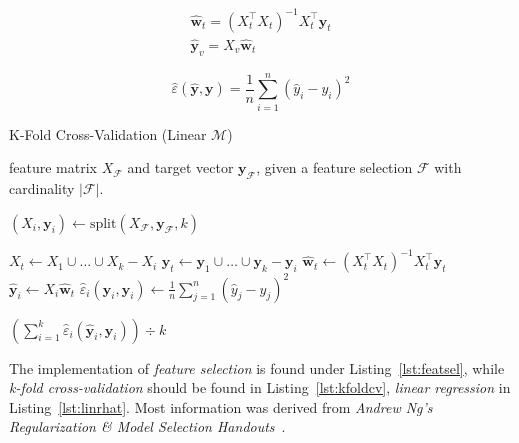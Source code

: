 \documentclass[a4paper, twocolumn]{article}
\begin{document}
    \begin{gather} \label{eq:linrhat}
        \mathbf{\hat{w}}^{}_t = (X_t^\intercal X^{}_t)^{-1} X_t^\intercal \mathbf{y}^{}_t \\
        \mathbf{\hat{y}}^{}_v = X^{}_v \mathbf{\hat{w}}^{}_t
    \end{gather}

    \begin{equation} \label{eq:mse}
        \hat{\varepsilon}(\mathbf{\hat{y}}, \mathbf{y}) = \frac{1}{n}\sum_{i=1}^{n}(\hat{y}_i - y_i)^2
    \end{equation}

    \begin{algorithm}
        \caption{K-Fold Cross-Validation (Linear $\mathcal{M}$)}
    \label{alg:kfoldcv}
    \begin{algorithmic}[1]
        \REQUIRE feature matrix $X_\mathcal{F}$ and target vector $\mathbf{y_\mathcal{F}}$,
                 given a feature selection $\mathcal{F}$ with cardinality $|\mathcal{F}|$.

        \STATE $(X_i, \mathbf{y}_i) \leftarrow \mathrm{split}(X_\mathcal{F}, \mathbf{y}_\mathcal{F}, k)$ 

            \STATE $X_t \leftarrow X_1 \cup \dots \cup X_k - X_i$ 
            \STATE $\mathbf{y}_t \leftarrow \mathbf{y}_1 \cup \dots \cup \mathbf{y}_k - \mathbf{y}_i$ 
            \STATE $\mathbf{\hat{w}}_t \leftarrow (X_t^\intercal X^{}_t)^{-1} X_t^\intercal \mathbf{y}^{}_t$ 
            \STATE $\mathbf{\hat{y}}^{}_i \leftarrow X^{}_i \mathbf{\hat{w}}^{}_t$ 
            \STATE $\hat{\varepsilon}_i(\mathbf{\hat{y}}_i, \mathbf{y}_i) \leftarrow \frac{1}{n}\sum_{j=1}^{n}(\hat{y}_j - y_j)^2$
        \ENDFOR

        \RETURN $(\sum_{i=1}^k{\hat{\varepsilon}_i(\mathbf{\hat{y}}_i, \mathbf{y}_i)}) \div k$
    \end{algorithmic}
    \end{algorithm}

    The implementation of \emph{feature selection} is found under Listing~\ref{lst:featsel}, while \emph{k-fold cross-validation} should be found in Listing~\ref{lst:kfoldcv}, \emph{linear regression} in Listing~\ref{lst:linrhat}. Most information was derived from \emph{Andrew Ng's Regularization \& Model Selection Handouts}~\cite{ng2016notes}.
\end{document}
